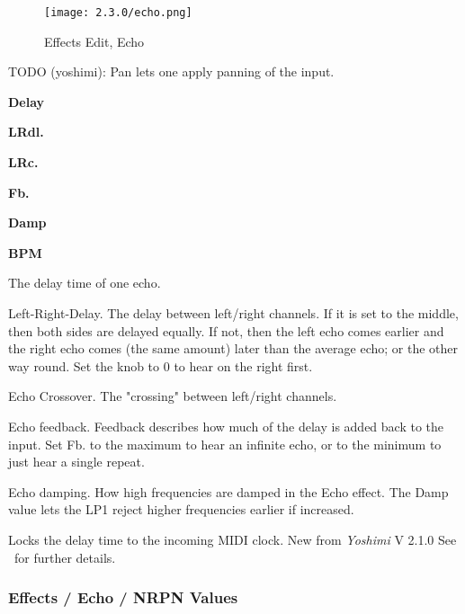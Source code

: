 \begin{figure}[H]
   \centering
   \texttt{[image: 2.3.0/echo.png]}
   \caption{Effects Edit, Echo}
   \label{fig:effects_edit_echo}
\end{figure}

   TODO (yoshimi):  Pan lets one apply panning of the input.

   \begin{enumber}
      \item \textbf{Delay}
      \item \textbf{LRdl.}
      \item \textbf{LRc.}
      \item \textbf{Fb.}
      \item \textbf{Damp}
      \item \textbf{BPM}
   \end{enumber}

   \setcounter{ItemCounter}{0}      %

   The delay time of one echo.

   Left-Right-Delay.
   The delay between left/right channels.
   If it is set to the middle, then both sides are delayed equally. If
   not, then the left echo comes earlier and the right echo comes (the
   same amount) later than the average echo; or the other way round.
   Set the knob to 0 to hear on the right first.

   Echo Crossover.
   The "crossing" between left/right channels.

   Echo feedback.
   Feedback describes how much of the delay is added back to the input.
   Set Fb. to the maximum to hear an infinite echo, or to the minimum to
   just hear a single repeat.

   Echo damping.
   How high frequencies are damped in the Echo effect.
   The Damp value lets the LP1 reject higher frequencies earlier if
   increased.

   Locks the delay time to the incoming MIDI clock. New from
   \textsl{Yoshimi} V 2.1.0 See
   \ for further details.

\subsubsection{Effects / Echo / NRPN Values}
\label{subsubsec:effects_edit_echo_nrpn}

